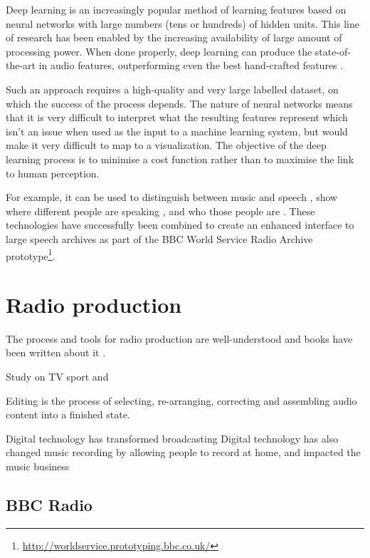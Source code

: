 Deep learning is an increasingly popular method of learning features based on neural networks with large numbers (tens
or hundreds) of hidden units. This line of research has been enabled by the increasing availability of large amount of
processing power. When done properly, deep learning can produce the state-of-the-art in audio features, outperforming
even the best hand-crafted features \citep{Hamel2010,Sigtia2014}.

Such an approach requires a high-quality and very large labelled dataset, on which the success of the process depends.
The nature of neural networks means that it is very difficult to interpret what the resulting features represent which
isn't an issue when used as the input to a machine learning system, but would make it very difficult to map to a
visualization. The objective of the deep learning process is to minimise a cost function rather than to maximise the
link to human perception.




For example, it can be
used to distinguish between music and speech \citep{Wieser2014}, show where
different people are speaking \citep{AngueraMiro2012}, and who those people are
\citep{Doddington1985}. These technologies have successfully been combined to
create an enhanced interface to large speech archives as part of the BBC World
Service Radio Archive
prototype\footnote{\url{http://worldservice.prototyping.bbc.co.uk/}}.


\section{Radio production}

The process and tools for radio production are well-understood and books have been written about it
\citep{McLeish2015,Hausman2012}.


Study on TV sport \citep{Perry2009} and \citep{Engstroem2010}


Editing is the process of selecting, re-arranging, correcting and assembling audio content into a finished state.

Digital technology has transformed broadcasting \citep{Pizzi1989,Peus2011}
Digital technology has also changed music recording by allowing people to record at home, and impacted the music
business \citep{Pras2013}

\subsection{BBC Radio}

